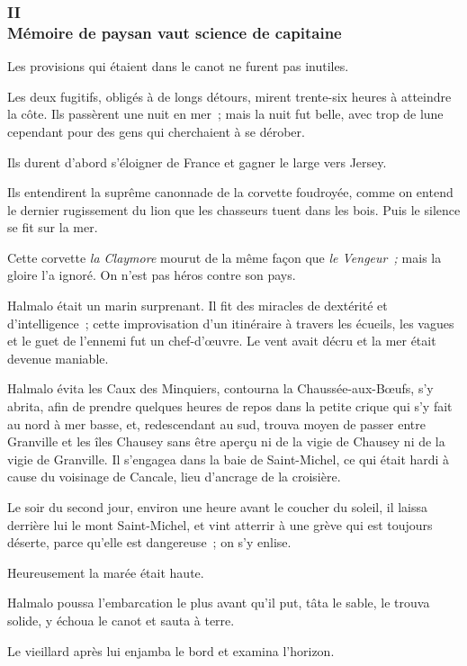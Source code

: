 \documentclass[french,twoside]{book} %
\begin{document}
 \subsubsection[{II. Mémoire de paysan vaut science de capitaine}]{II \\
Mémoire de paysan vaut science de capitaine}
\label{p1l3c2}
\noindent Les provisions qui étaient dans le canot ne furent pas inutiles.\par
Les deux fugitifs, obligés à de longs détours, mirent trente-six heures à atteindre la côte. Ils passèrent une nuit en mer ; mais la nuit fut belle, avec trop de lune cependant pour des gens qui cherchaient à se dérober.\par
Ils durent d’abord s’éloigner de France et gagner le large vers Jersey.\par
Ils entendirent la suprême canonnade de la corvette foudroyée, comme on entend le dernier rugissement du lion que les chasseurs tuent dans les bois. Puis le silence se fit sur la mer.\par
Cette corvette \emph{la Claymore} mourut de la même façon que \emph{le Vengeur ;} mais la gloire l’a ignoré. On n’est pas héros contre son pays.\par
Halmalo était un marin surprenant. Il fit des miracles de dextérité et d’intelligence ; cette improvisation d’un itinéraire à travers les écueils, les vagues et le guet de l’ennemi fut un chef-d’œuvre. Le vent avait décru et la mer était devenue maniable.\par
 Halmalo évita les Caux des Minquiers, contourna la Chaussée-aux-Bœufs, s’y abrita, afin de prendre quelques heures de repos dans la petite crique qui s’y fait au nord à mer basse, et, redescendant au sud, trouva moyen de passer entre Granville et les îles Chausey sans être aperçu ni de la vigie de Chausey ni de la vigie de Granville. Il s’engagea dans la baie de Saint-Michel, ce qui était hardi à cause du voisinage de Cancale, lieu d’ancrage de la croisière.\par
Le soir du second jour, environ une heure avant le coucher du soleil, il laissa derrière lui le mont Saint-Michel, et vint atterrir à une grève qui est toujours déserte, parce qu’elle est dangereuse ; on s’y enlise.\par
Heureusement la marée était haute.\par
Halmalo poussa l’embarcation le plus avant qu’il put, tâta le sable, le trouva solide, y échoua le canot et sauta à terre.\par
Le vieillard après lui enjamba le bord et examina l’horizon.\par
\end{document}
